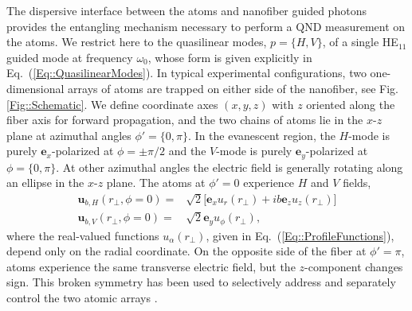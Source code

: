 \documentclass[preprint, aps,pra,onecolumn]{revtex4-1} %
\newcommand{\erf}[1]{Eq.~(\ref{#1})}
\newcommand{\mbf}[1]{\mathbf{#1}}
\begin{document}
The dispersive interface between the atoms and nanofiber guided photons provides the entangling mechanism necessary to perform a QND measurement on the atoms.  
We restrict here to the quasilinear modes, $p =\{H,V\}$, of a single HE$_{11}$ guided mode at frequency $\omega_0$, whose form is given explicitly in \erf{Eq::QuasilinearModes}.  
In typical experimental configurations, two one-dimensional arrays of atoms are trapped on either side of the nanofiber, see Fig. \ref{Fig::Schematic}. 
We define coordinate axes $(x,y,z)$ with $z$ oriented along the fiber axis for forward propagation, and the two chains of atoms lie in the $x$-$z$ plane at azimuthal angles $\phi' = \{0, \pi\}$.
In the evanescent region, the $H$-mode is purely $\mathbf{e}_x$-polarized at $\phi = \pm \pi/2$ and the $V$-mode is purely $\mathbf{e}_y$-polarized at $\phi = \{0,\pi\}$.  
At other azimuthal angles the electric field is generally rotating along an ellipse in the $x$-$z$ plane.  The atoms at $\phi'=0$ experience $H$ and $V$ fields,
\begin{subequations}
	\begin{align}
		\mbf{u}_{b,H}(r_\perp, \phi = 0) = & \sqrt{2} \big[ \mathbf{e}_x u_r(r_\perp)+  i b \mathbf{e}_z  u_z(r_\perp) \big] \\
		\mbf{u}_{b,V}(r_\perp, \phi = 0) = & \sqrt{2} \mathbf{e}_y u_\phi(r_\perp), 
	\end{align}
\end{subequations}
where the real-valued functions $u_\alpha(r_\perp)$, given in \erf{Eq::ProfileFunctions}, depend only on the radial coordinate.  
On the opposite side of the fiber at $\phi' = \pi$, atoms experience the same transverse electric field, but the $z$-component changes sign.   This broken symmetry has been used to selectively address and separately control the two atomic arrays \cite{mitsch_exploiting_2014, mitsch_quantum_2014, sayrin_storage_2015}.  
\end{document}
